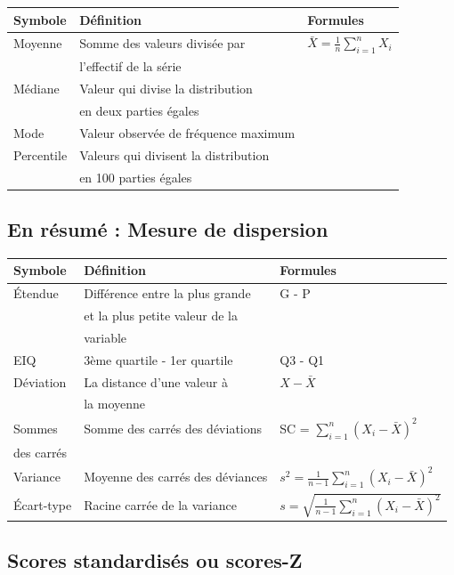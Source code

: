 \documentclass[
]{article}
\begin{document}
\begin{longtable}[]{@{}lll@{}}
\toprule()
Symbole & Définition & Formules \\
\midrule()
\endhead
Moyenne & Somme des valeurs divisée par &
\(\bar{X} = \frac{1}{n} \sum_{i=1}^n X_i\) \\
& l'effectif de la série & \\
Médiane & Valeur qui divise la distribution & \\
& en deux parties égales & \\
Mode & Valeur observée de fréquence maximum & \\
Percentile & Valeurs qui divisent la distribution & \\
& en 100 parties égales & \\
\bottomrule()
\end{longtable}

\hypertarget{en-ruxe9sumuxe9-mesure-de-dispersion}{%
\subsection{En résumé : Mesure de
dispersion}\label{en-ruxe9sumuxe9-mesure-de-dispersion}}

\begin{longtable}[]{@{}lll@{}}
\toprule()
Symbole & Définition & Formules \\
\midrule()
\endhead
Étendue & Différence entre la plus grande & G - P \\
& et la plus petite valeur de la & \\
& variable & \\
EIQ & 3ème quartile - 1er quartile & Q3 - Q1 \\
Déviation & La distance d'une valeur à & \(X - \bar{X}\) \\
& la moyenne & \\
Sommes & Somme des carrés des déviations & SC =
\(\sum_{i=1}^n (X_i - \bar{X})^2\) \\
des carrés & & \\
Variance & Moyenne des carrés des déviances &
\(s^2 = \frac{1}{n-1} \sum_{i=1}^n (X_i - \bar{X})^2\) \\
Écart-type & Racine carrée de la variance &
\(s = \sqrt{\frac{1}{n-1} \sum_{i=1}^n (X_i - \bar{X})^2}\) \\
\bottomrule()
\end{longtable}

\hypertarget{scores-standardisuxe9s-ou-scores-z}{%
\subsection{Scores standardisés ou
scores-Z}\label{scores-standardisuxe9s-ou-scores-z}}
\end{document}

